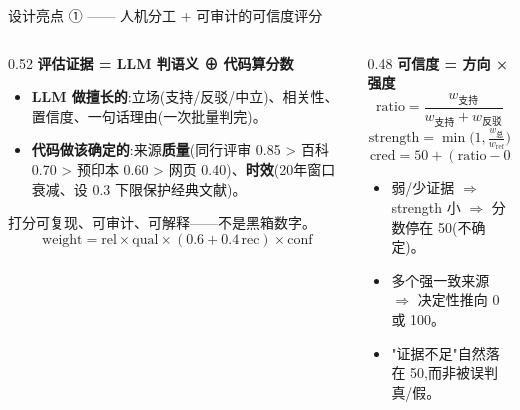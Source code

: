 \documentclass[aspectratio=169,11pt]{beamer}
\begin{document}
\begin{frame}{设计亮点 ① —— 人机分工 + 可审计的可信度评分}
  \begin{columns}[T]
    \begin{column}{0.52\textwidth}
      \textbf{评估证据 = LLM 判语义 ⊕ 代码算分数}
      \begin{itemize}\footnotesize
        \item \textbf{LLM 做擅长的}:立场(支持/反驳/中立)、相关性、置信度、一句话理由(一次批量判完)。
        \item \textbf{代码做该确定的}:来源\textbf{质量}(同行评审 0.85 > 百科 0.70 > 预印本 0.60 > 网页 0.40)、\textbf{时效}(20年窗口衰减、设 0.3 下限保护经典文献)。
      \end{itemize}
      \vspace{1mm}
      {\scriptsize\color{slate} 打分可复现、可审计、可解释——不是黑箱数字。}
      \vspace{2mm}
      \footnotesize
      $$\text{weight}=\text{rel}\times\text{qual}\times(0.6{+}0.4\,\text{rec})\times\text{conf}$$
    \end{column}
    \begin{column}{0.48\textwidth}
      \textbf{可信度 = 方向 × 强度}
      \vspace{1mm}
      \footnotesize
      \[ \text{ratio}=\frac{w_{\text{支持}}}{w_{\text{支持}}+w_{\text{反驳}}} \]
      \[ \text{strength}=\min\!\Big(1,\tfrac{w_{\text{总}}}{w_{\text{ref}}}\Big) \]
      \[ \boxed{\,\text{cred}=50+(\text{ratio}{-}0.5)\times100\times\text{strength}\,} \]
      \vspace{1mm}
      \begin{itemize}\scriptsize
        \item 弱/少证据 $\Rightarrow$ strength 小 $\Rightarrow$ 分数停在 50(不确定)。
        \item 多个强一致来源 $\Rightarrow$ 决定性推向 0 或 100。
        \item "证据不足"自然落在 50,而非被误判真/假。
      \end{itemize}
    \end{column}
  \end{columns}
\end{frame}
\end{document}
